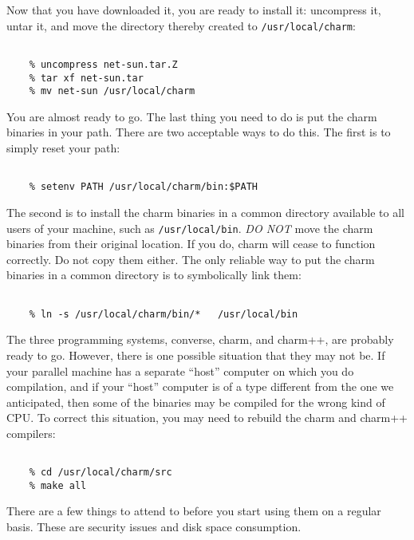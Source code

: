 Now that you have downloaded it, you are ready to install it: uncompress it,
untar it, and move the directory thereby created to {\tt /usr/local/charm}:

\begin{verbatim}

    % uncompress net-sun.tar.Z
    % tar xf net-sun.tar
    % mv net-sun /usr/local/charm

\end{verbatim}

You are almost ready to go.  The last thing you need to do is put the
charm binaries in your path.  There are two acceptable ways to do
this.  The first is to simply reset your path:

\begin{verbatim}

    % setenv PATH /usr/local/charm/bin:$PATH

\end{verbatim}

The second is to install the charm binaries in a common directory available
to all users of your machine, such as {\tt /usr/local/bin}.  {\em DO NOT}
move the charm binaries from their original location.  If you do, charm will
cease to function correctly.  Do not copy them either.  The only reliable
way to put the charm binaries in a common directory is to symbolically link
them:

\begin{verbatim}

    % ln -s /usr/local/charm/bin/*   /usr/local/bin

\end{verbatim}

The three programming systems, converse, charm, and charm++, are
probably ready to go.  However, there is one possible situation that
they may not be.  If your parallel machine has a separate ``host''
computer on which you do compilation, and if your ``host'' computer is
of a type different from the one we anticipated, then some of the
binaries may be compiled for the wrong kind of CPU.  To correct this
situation, you may need to rebuild the charm and charm++ compilers:

\begin{verbatim}

    % cd /usr/local/charm/src
    % make all

\end{verbatim}

There are a few things to attend to before you start using them on a
regular basis.  These are security issues and disk space consumption.

